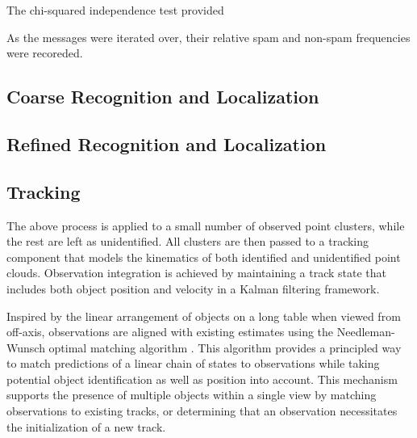 \documentclass[letterpaper, 10 pt, conference]{ieeeconf}  %
\begin{document}
The chi-squared independence test provided 

As the messages were iterated over, their relative
spam and non-spam frequencies were recoreded.






\subsection{Coarse Recognition and Localization}


\subsection{Refined Recognition and Localization}


\subsection{Tracking}
The above process is applied to a small number of observed point
clusters, while the rest are left as unidentified. All clusters are
then passed to a tracking component that models the kinematics of both
identified and unidentified point clouds. Observation integration is
achieved by maintaining a track state that includes both object
position and velocity in a Kalman filtering framework.

Inspired by the linear arrangement of objects on a long table when
viewed from off-axis, observations are aligned with existing estimates
using the Needleman-Wunsch optimal matching algorithm
\cite{NeedlemanWunsch1970}. This algorithm provides a principled way
to match predictions of a linear chain of states to observations while
taking potential object identification as well as position into
account. This mechanism supports the presence of multiple objects
within a single view by matching observations to existing tracks, or
determining that an observation necessitates the initialization of a
new track.

\end{document}
